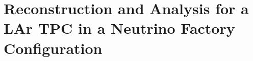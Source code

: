 \chapter{Reconstruction and Analysis for a LAr TPC in a Neutrino Factory Configuration}\label{chapter:Analysis}

